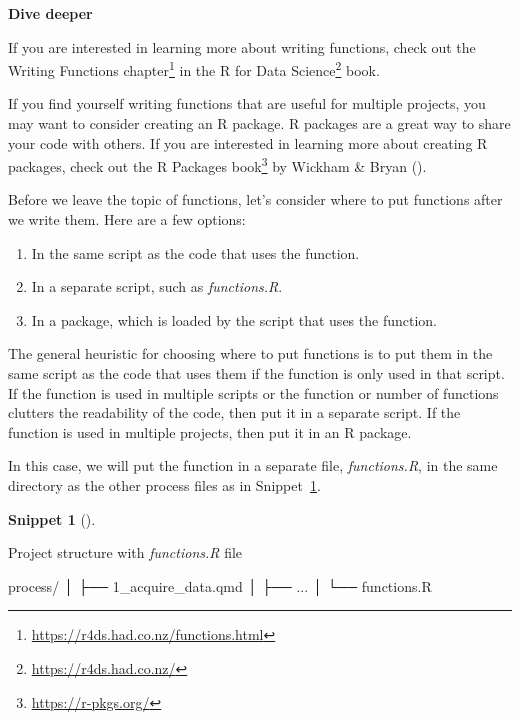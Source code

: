 \documentclass[
  letterpaper,
  krantz1]{latex/krantz-mod}
\newenvironment{Shaded}{\begin{snugshade}}{\end{snugshade}}
\newcommand{\ExtensionTok}[1]{\textcolor[rgb]{0.00,0.00,0.00}{#1}}
\newcommand{\NormalTok}[1]{\textcolor[rgb]{0.00,0.00,0.00}{#1}}
\providecommand{\tightlist}{%
  \setlength{\itemsep}{0pt}\setlength{\parskip}{0pt}}\usepackage{longtable,booktabs,array}
\theoremstyle{definition}
\theoremstyle{definition}
\newtheorem{definition}{Snippet}[chapter]
\theoremstyle{remark}
\DeclareRobustCommand{\href}[2]{#2\footnote{\url{#1}}}
\begin{document}
\begin{tcolorbox}[enhanced jigsaw, leftrule=.75mm, colframe=quarto-callout-color-frame, left=2mm, colback=white, toprule=.15mm, breakable, arc=.35mm, opacityback=0, bottomrule=.15mm, rightrule=.15mm]

\textbf{ Dive deeper}

If you are interested in learning more about writing functions, check
out the \href{https://r4ds.had.co.nz/functions.html}{Writing Functions
chapter} in the \href{https://r4ds.had.co.nz/}{R for Data Science} book.

If you find yourself writing functions that are useful for multiple
projects, you may want to consider creating an R package. R packages are
a great way to share your code with others. If you are interested in
learning more about creating R packages, check out the
\href{https://r-pkgs.org/}{R Packages book} by Wickham \& Bryan
().

\end{tcolorbox}

Before we leave the topic of functions, let's consider where to put
functions after we write them. Here are a few options:

\begin{enumerate}
\def\labelenumi{\arabic{enumi}.}
\tightlist
\item
  In the same script as the code that uses the function.
\item
  In a separate script, such as \emph{functions.R}.
\item
  In a package, which is loaded by the script that uses the function.
\end{enumerate}

The general heuristic for choosing where to put functions is to put them
in the same script as the code that uses them if the function is only
used in that script. If the function is used in multiple scripts or the
function or number of functions clutters the readability of the code,
then put it in a separate script. If the function is used in multiple
projects, then put it in an R package.

In this case, we will put the function in a separate file,
\emph{functions.R}, in the same directory as the other process files as
in Snippet~\ref{def-acquire-functions-r}.

\begin{definition}[]\protect\hypertarget{def-acquire-functions-r}{}\label{def-acquire-functions-r}

Project structure with \emph{functions.R} file

\begin{Shaded}
\begin{Highlighting}[]
\ExtensionTok{process/}
  \ExtensionTok{│}\NormalTok{   ├── 1\_acquire\_data.qmd}
  \ExtensionTok{│}\NormalTok{   ├── ...}
  \ExtensionTok{│}\NormalTok{   └── functions.R}
\end{Highlighting}
\end{Shaded}

\end{definition}
\end{document}
